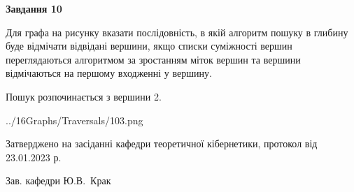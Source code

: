\documentclass[12pt, ukrainian]{article}
\begin{document}
{\begin {large}
{\begin {center}\textbf{Завдання 10}\end {center}}\par
Для графа на рисунку вказати послідовність, в якій алгоритм пошуку в глибину буде відмічати відвідані вершини, якщо списки суміжності вершин переглядаються алгоритмом за зростанням міток вершин та вершини відмічаються на першому вход\-женні у вершину.\par
Пошук розпочинається з вершини 2.\par

\begin{center}
	{../16Graphs/Traversals/103.png}
\end{center}\par
\newpage


\end {large}
}
{\smallskip \begin {small} Затверджено на засіданні кафедри теоретичної кібернетики, протокол  від   23.01.2023 р.\par\smallskip\smallskip
{\parbox {6.5 cm}{Зав. кафедри \dotfill Ю.В.~Крак}} \end{small}}
\end{document}
